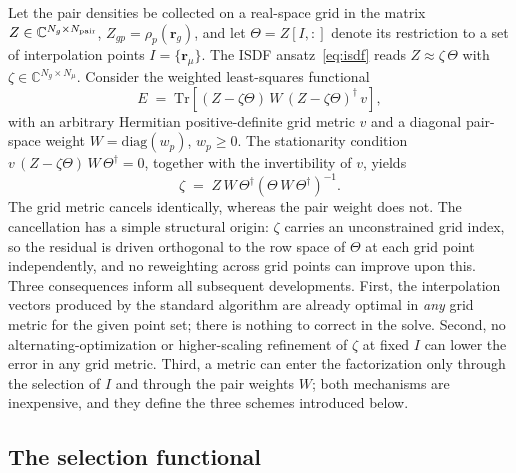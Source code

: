 \documentclass[aps,prb,twocolumn,superscriptaddress,amsmath,amssymb]{revtex4-2}
\newcommand{\Nmu}{N_\mu}
\newcommand{\rr}{\mathbf{r}}
\begin{document}
Let the pair densities be collected on a real-space grid in the matrix
$Z \in \mathbb{C}^{N_g \times N_{\rm pair}}$, $Z_{gp} = \rho_p(\rr_g)$, and
let $\Theta = Z[I,:]$ denote its restriction to a set of interpolation
points $I = \{\rr_\mu\}$. The ISDF ansatz~\eqref{eq:isdf} reads
$Z \approx \zeta\,\Theta$ with $\zeta \in \mathbb{C}^{N_g\times \Nmu}$.
Consider the weighted least-squares functional
\begin{equation}
  E \;=\; \mathrm{Tr}\!\left[ (Z-\zeta\Theta)\, W\, (Z-\zeta\Theta)^{\dagger}\, v \right],
  \label{eq:functional}
\end{equation}
with an arbitrary Hermitian positive-definite grid metric $v$ and a
diagonal pair-space weight $W = \mathrm{diag}(w_p)$, $w_p \ge 0$. The
stationarity condition
$v\,(Z-\zeta\Theta)\,W\,\Theta^{\dagger} = 0$, together with the
invertibility of $v$, yields
\begin{equation}
  \zeta \;=\; Z\,W\,\Theta^{\dagger} \left( \Theta\, W\, \Theta^{\dagger} \right)^{-1}.
  \label{eq:zeta}
\end{equation}
The grid metric cancels identically, whereas the pair weight does not. The
cancellation has a simple structural origin: $\zeta$ carries an unconstrained
grid index, so the residual is driven orthogonal to the row space of
$\Theta$ at each grid point independently, and no reweighting across grid
points can improve upon this. Three consequences inform all subsequent
developments. First, the interpolation vectors produced by the standard
algorithm are already optimal in \emph{any} grid metric for the given point
set; there is nothing to correct in the solve. Second, no
alternating-optimization or higher-scaling refinement of $\zeta$ at fixed
$I$ can lower the error in any grid metric. Third, a metric can enter the
factorization only through the selection of $I$ and through the pair weights
$W$; both mechanisms are inexpensive, and they define the three schemes
introduced below.

\subsection{The selection functional}
\label{sec:objective}
\end{document}

